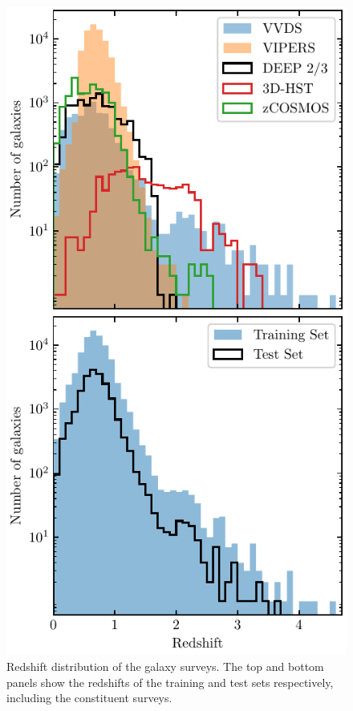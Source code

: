 \begin{figure}
    \centering
    \includegraphics{figures/redshift_distribution.pdf}
    \caption{Redshift distribution of the galaxy surveys. The top and bottom panels show the redshifts of the training and test sets respectively, including the constituent surveys.}
    \label{fig:redshift_dist}
\end{figure}

